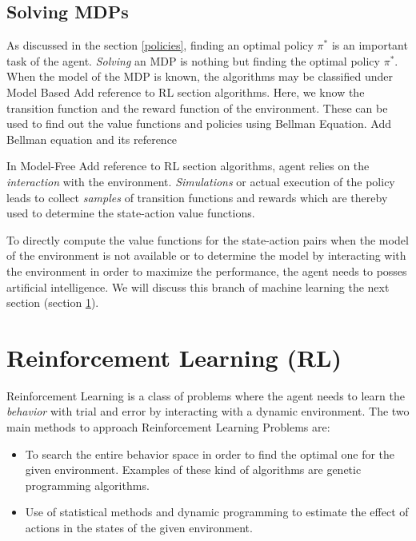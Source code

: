 \documentclass[12pt]{report}
\begin{document}
\subsection{Solving MDPs}
As discussed in the section \ref{policies}, finding an optimal policy $\pi^*$ is an important task of the agent. \textit{Solving} an MDP is nothing but finding the optimal policy $\pi^*$. When the model of the MDP is known, the algorithms may be classified under Model Based {\color{red} Add reference to RL section} algorithms. Here, we know the transition function and the reward function of the environment. These can be used to find out the value functions and policies using Bellman Equation. {\color{red} Add Bellman equation and its reference}\par 
In Model-Free {\color{red} Add reference to RL section} algorithms, agent relies on the \textit{interaction} with the environment. \textit{Simulations} or actual execution of the policy leads to collect \textit{samples} of transition functions and rewards which are thereby used to determine the state-action value functions.\par 
To directly compute the value functions for the state-action pairs when the model of the environment is not available or to determine the model by interacting with the environment in order to maximize the performance, the agent needs to posses artificial intelligence. We will discuss this branch of machine learning the next section (section \ref{rl}).

\section{Reinforcement Learning (RL)}
\label{rl}
Reinforcement Learning is a class of problems where the agent needs to learn the \textit{behavior} with trial and error by interacting with a dynamic environment. The two main methods to approach Reinforcement Learning Problems are:
\begin{itemize}
\item To search the entire behavior space in order to find the optimal one for the given environment. Examples of these kind of algorithms are genetic programming algorithms.
\item Use of statistical methods and dynamic programming to estimate the effect of actions in the states of the given environment. \cite{kaelbling1996reinforcement}
\end{itemize}
\end{document}

